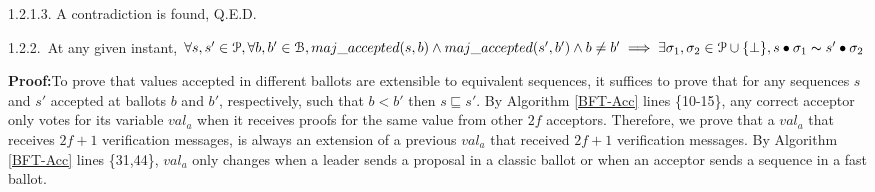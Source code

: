 \indent\indent\indent\indent\indent\indent\indent\parbox{\linewidth}{\strut1.2.1.3. A contradiction is found, Q.E.D. }\par
\indent\indent\indent\indent\indent\parbox{\linewidth-\algorithmicindent*5}{\strut1.2.2.~At any given instant, $\forall s,s' \in \mathcal{P},\forall b,b' \in \mathcal{B}, maj\_accepted(s,b) \land maj\_accepted(s',b') \land b \neq b' \implies \exists \sigma_1,\sigma_2 \in \mathcal{P} \cup \{\bot\}, s \bullet \sigma_1 \thicksim s' \bullet \sigma_2$} 
\indent\indent\indent\indent\indent\indent\parbox{\linewidth-\algorithmicindent*6}{\strut\textbf{Proof:}To prove that values accepted in different ballots are extensible to equivalent sequences, it suffices to prove that for any sequences $s$ and $s'$ accepted at ballots $b$ and $b'$, respectively, such that $b < b'$ then $s \sqsubseteq s'$. By Algorithm \ref{BFT-Acc} lines \{10-15\}, any correct acceptor only votes for its variable $val_a$ when it receives proofs for the same value from other $2f$ acceptors. Therefore, we prove that a $val_a$ that receives $2f+1$ verification messages, is always an extension of a previous $val_a$ that received $2f+1$ verification messages. By Algorithm \ref{BFT-Acc} lines \{31,44\}, $val_a$ only changes when a leader sends a proposal in a classic ballot or when an acceptor sends a sequence in a fast ballot.\par}
